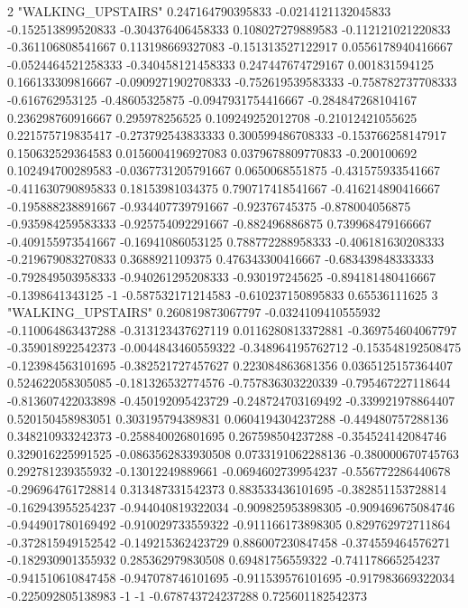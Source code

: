 2 "WALKING_UPSTAIRS" 0.247164790395833 -0.0214121132045833 -0.152513899520833 -0.304376406458333 0.108027279889583 -0.112121021220833 -0.361106808541667 0.113198669327083 -0.151313527122917 0.0556178940416667 -0.0524464521258333 -0.340458121458333 0.247447674729167 0.001831594125 0.166133309816667 -0.0909271902708333 -0.752619539583333 -0.758782737708333 -0.616762953125 -0.48605325875 -0.0947931754416667 -0.284847268104167 0.236298760916667 0.295978256525 0.109249252012708 -0.21012421055625 0.221575719835417 -0.273792543833333 0.300599486708333 -0.153766258147917 0.150632529364583 0.0156004196927083 0.0379678809770833 -0.200100692 0.102494700289583 -0.0367731205791667 0.0650068551875 -0.431575933541667 -0.411630790895833 0.18153981034375 0.790717418541667 -0.416214890416667 -0.195888238891667 -0.934407739791667 -0.92376745375 -0.878004056875 -0.935984259583333 -0.925754092291667 -0.882496886875 0.739968479166667 -0.409155973541667 -0.16941086053125 0.788772288958333 -0.406181630208333 -0.219679083270833 0.3688921109375 0.476343300416667 -0.683439848333333 -0.792849503958333 -0.940261295208333 -0.930197245625 -0.894181480416667 -0.1398641343125 -1 -0.587532171214583 -0.610237150895833 0.65536111625
3 "WALKING_UPSTAIRS" 0.260819873067797 -0.0324109410555932 -0.110064863437288 -0.313123437627119 0.0116280813372881 -0.369754604067797 -0.359018922542373 -0.0044843460559322 -0.348964195762712 -0.153548192508475 -0.123984563101695 -0.382521727457627 0.223084863681356 0.0365125157364407 0.524622058305085 -0.181326532774576 -0.757836303220339 -0.795467227118644 -0.813607422033898 -0.450192095423729 -0.248724703169492 -0.339921978864407 0.520150458983051 0.303195794389831 0.0604194304237288 -0.449480757288136 0.348210933242373 -0.258840026801695 0.267598504237288 -0.354524142084746 0.329016225991525 -0.0863562833930508 0.0733191062288136 -0.380000670745763 0.292781239355932 -0.13012249889661 -0.0694602739954237 -0.556772286440678 -0.296964761728814 0.313487331542373 0.883533436101695 -0.382851153728814 -0.162943955254237 -0.944040819322034 -0.909825953898305 -0.909469675084746 -0.944901780169492 -0.910029733559322 -0.911166173898305 0.829762972711864 -0.372815949152542 -0.149215362423729 0.886007230847458 -0.374559464576271 -0.182930901355932 0.285362979830508 0.69481756559322 -0.741178665254237 -0.941510610847458 -0.947078746101695 -0.911539576101695 -0.917983669322034 -0.225092805138983 -1 -1 -0.678743724237288 0.725601182542373
